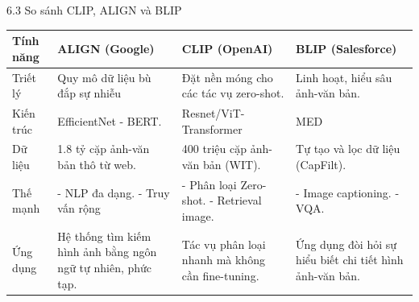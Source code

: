 \begin{frame}{6.3 So sánh CLIP, ALIGN và BLIP}
\begin{table}[H]
{%
\begin{tabular}{|l|p{3.6cm}|p{3.7cm}|p{3.4cm}|}
\hline
\textbf{Tính năng} & \textbf{ALIGN (Google)} & \textbf{CLIP (OpenAI)} & \textbf{BLIP (Salesforce)} \\ \hline
Triết lý & Quy mô dữ liệu bù đắp sự nhiễu & Đặt nền móng cho các tác vụ zero-shot. & Linh hoạt, hiểu sâu ảnh-văn bản. \\ \hline
Kiến trúc & EfficientNet - BERT. & Resnet/ViT-Transformer & MED \\ \hline
Dữ liệu & 1.8 tỷ cặp ảnh-văn bản thô từ web. & 400 triệu cặp ảnh-văn bản (WIT). & Tự tạo và lọc dữ liệu (CapFilt). \\ \hline
Thế mạnh & - NLP đa dạng. \newline - Truy vấn rộng& - Phân loại Zero-shot. \newline - Retrieval image. & - Image captioning. \newline - VQA. \\ \hline
Ứng dụng & Hệ thống tìm kiếm hình ảnh bằng ngôn ngữ tự nhiên, phức tạp. & Tác vụ phân loại nhanh mà không cần fine-tuning. & Ứng dụng đòi hỏi sự hiểu biết chi tiết hình ảnh-văn bản. \\ \hline
\end{tabular}%
}
\end{table}
\end{frame}
